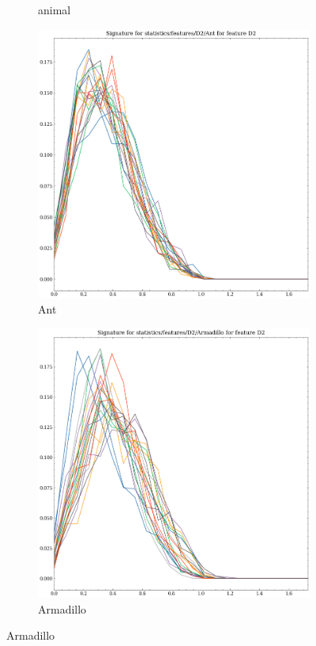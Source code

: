 \begin{figure}[t!p]
\begin{subfigure}[b]{0.23\textwidth}
        \caption{animal}    
    \end{subfigure}
    \hfill
    \begin{subfigure}[b]{0.23\textwidth}
        \includegraphics[width=\textwidth]{assets/feature_extraction/D2/Ant.png}
        \caption{Ant}
    \end{subfigure}
    \hfill    
    \begin{subfigure}[b]{0.23\textwidth}
        \includegraphics[width=\textwidth]{assets/feature_extraction/D2/Armadillo.png}
        \caption{Armadillo}
    \end{subfigure}
    \hfill
    

\end{figure}
